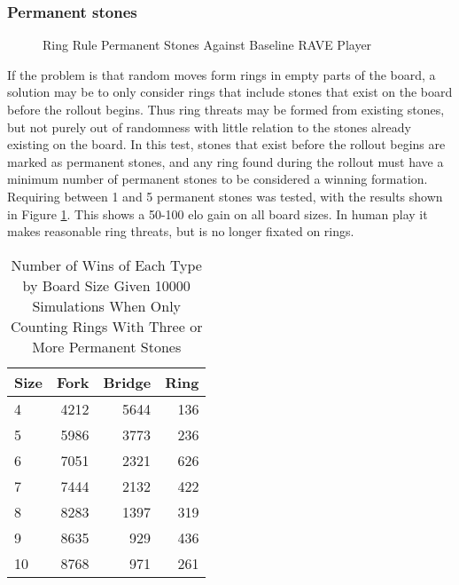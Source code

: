 \subsubsection{Permanent stones}

\begin{figure}
	\centering
{}
	\caption{Ring Rule Permanent Stones Against Baseline RAVE Player}
	\label{fig:ringperm}
\end{figure}

If the problem is that random moves form rings in empty parts of the board, a solution may be to only consider rings that include stones that exist on the board before the rollout begins. Thus ring threats may be formed from existing stones, but not purely out of randomness with little relation to the stones already existing on the board. In this test, stones that exist before the rollout begins are marked as permanent stones, and any ring found during the rollout must have a minimum number of permanent stones to be considered a winning formation. Requiring between 1 and 5 permanent stones was tested, with the results shown in Figure \ref{fig:ringperm}. This shows a 50-100 elo gain on all board sizes. In human play it makes reasonable ring threats, but is no longer fixated on rings.


\begin{table}
	\centering
	\begin{tabular}{l|rrr}
		Size & Fork & Bridge & Ring \\ \hline
		   4 & 4212 &   5644 & 136 \\
		   5 & 5986 &   3773 & 236 \\
		   6 & 7051 &   2321 & 626 \\
		   7 & 7444 &   2132 & 422 \\
		   8 & 8283 &   1397 & 319 \\
		   9 & 8635 &    929 & 436 \\
		  10 & 8768 &    971 & 261 \\
	\end{tabular}
	\caption{Number of Wins of Each Type by Board Size Given 10000 Simulations When Only Counting Rings With Three or More Permanent Stones}
	\label{tab:wintypesperm}
\end{table}

